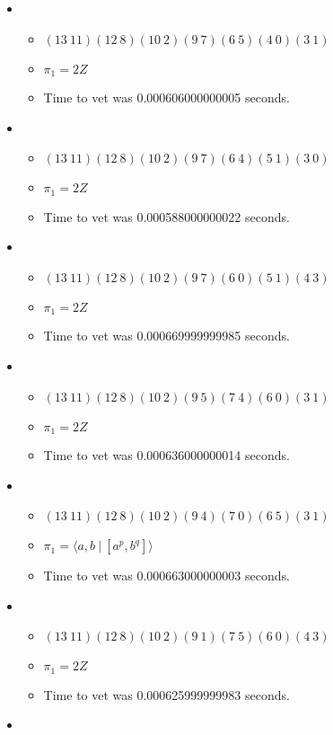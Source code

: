 \documentclass{article}
\begin{document}
\begin{itemize}
\begin{itemize}
\end{itemize}
\item \begin{itemize}
      \item $(13\ 11)(12\ 8)(10\ 2)(9\ 7)(6\ 5)(4\ 0)(3\ 1)$
      \item $\pi_1 =2 Z$
      \item Time to vet was 0.000606000000005 seconds.
\end{itemize}
\item \begin{itemize}
      \item $(13\ 11)(12\ 8)(10\ 2)(9\ 7)(6\ 4)(5\ 1)(3\ 0)$
      \item $\pi_1 =2 Z$
      \item Time to vet was 0.000588000000022 seconds.
\end{itemize}
\item \begin{itemize}
      \item $(13\ 11)(12\ 8)(10\ 2)(9\ 7)(6\ 0)(5\ 1)(4\ 3)$
      \item $\pi_1 =2 Z$
      \item Time to vet was 0.000669999999985 seconds.
\end{itemize}
\item \begin{itemize}
      \item $(13\ 11)(12\ 8)(10\ 2)(9\ 5)(7\ 4)(6\ 0)(3\ 1)$
      \item $\pi_1 =2 Z$
      \item Time to vet was 0.000636000000014 seconds.
\end{itemize}
\item \begin{itemize}
      \item $(13\ 11)(12\ 8)(10\ 2)(9\ 4)(7\ 0)(6\ 5)(3\ 1)$
      \item $\pi_1 = \langle a,b\ |\ [a^p,b^q]\rangle$
      \item Time to vet was 0.000663000000003 seconds.
\end{itemize}
\item \begin{itemize}
      \item $(13\ 11)(12\ 8)(10\ 2)(9\ 1)(7\ 5)(6\ 0)(4\ 3)$
      \item $\pi_1 =2 Z$
      \item Time to vet was 0.000625999999983 seconds.
\end{itemize}
\item \begin{itemize}

\end{itemize}
\end{itemize}
\end{document}
